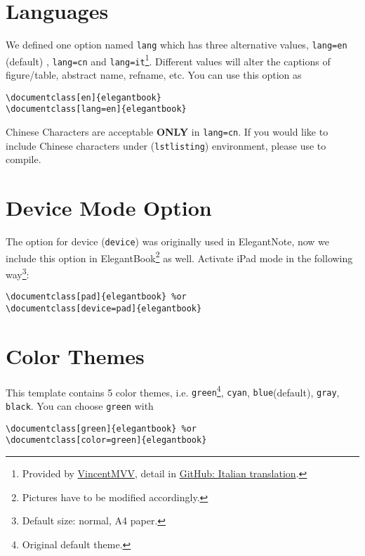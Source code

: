 \documentclass[11pt,fancy,authoryear]{elegantbook}
\begin{document}
\section{Languages}
We defined one option named \lstinline{lang} which has three alternative values, \lstinline{lang=en} (default) , \lstinline{lang=cn} and \lstinline{lang=it}\footnote{Provided by \href{https://github.com/VincentMVV}{VincentMVV}, detail in \href{https://github.com/ElegantLaTeX/ElegantBook/issues/85}{GitHub: Italian translation}.}. Different values will alter the captions of figure/table, abstract name, refname, etc. You can use this option as
\begin{lstlisting}
\documentclass[en]{elegantbook} 
\documentclass[lang=en]{elegantbook}
\end{lstlisting}

\begin{remark}
Chinese Characters  are acceptable \textbf{ONLY} in \lstinline{lang=cn}. If you would like to include Chinese characters under (\lstinline{lstlisting}) environment, please use  to compile.
\end{remark}

\section{Device Mode Option}
The option for device (\lstinline{device}) was originally used in ElegantNote, now we include this option in ElegantBook\footnote{Pictures have to be modified accordingly.} as well. Activate iPad mode in the following way\footnote{Default size: normal, A4 paper.}:
\begin{lstlisting}
\documentclass[pad]{elegantbook} %or
\documentclass[device=pad]{elegantbook}
\end{lstlisting}

\section{Color Themes}
This template contains 5 color themes, i.e. \textcolor{structure1}{\lstinline{green}}\footnote{Original default theme.}, \textcolor{structure2}{\lstinline{cyan}}, \textcolor{structure3}{\lstinline{blue}}(default), \textcolor{structure4}{\lstinline{gray}}, \textcolor{structure5}{\lstinline{black}}. You can choose \lstinline{green} with
\begin{lstlisting}
\documentclass[green]{elegantbook} %or
\documentclass[color=green]{elegantbook}
\end{lstlisting}
\end{document}
